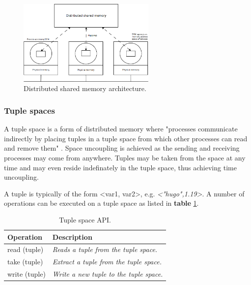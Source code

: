 \begin{figure}[h]
	\begin{center}
		\includegraphics[width=0.6\textwidth]{img/systems-and-architectures/dsm}
	\end{center}
	\caption{Distributed shared memory architecture.}
	\label{fig:dsm}
\end{figure}



\subsubsection{Tuple spaces}

A tuple space is a form of distributed memory where "processes communicate indirectly by placing tuples in a tuple space from which other processes can read and remove them" \cite{Coulouris:2011:DSC:2029110}. Space uncoupling is achieved as the sending and receiving processes may come from anywhere. Tuples may be taken from the space at any time and may even reside indefinately in the tuple space, thus achieving time uncoupling.

A tuple is typically of the form <var1, var2>, e.g. \emph{<"hugo",1.19>}. A number of operations can be executed on a tuple space as listed in \textbf{table} \ref{tab:api:tuplespaces}.


\begin{table}[h]
	\caption{Tuple space API.}
	\label{tab:api:tuplespaces}
	\begin{tabular}{p{150px} | p{250px}}
		\textbf{Operation} & \textbf{Description} \\
		\hline
		read (tuple) 	& \emph{Reads a tuple from the tuple space.} \\
		take (tuple) 	& \emph{Extract a tuple from the tuple space.} \\
		write (tuple) & \emph{Write a new tuple to the tuple space.} \\
		\hline
	\end{tabular}
\end{table}


